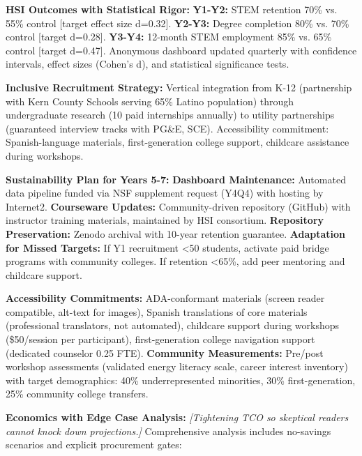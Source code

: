 \documentclass[12pt]{article}
\begin{document}
\textbf{HSI Outcomes with Statistical Rigor:} \textbf{Y1-Y2:} STEM retention 70\% vs. 55\% control [target effect size d=0.32]. \textbf{Y2-Y3:} Degree completion 80\% vs. 70\% control [target d=0.28]. \textbf{Y3-Y4:} 12-month STEM employment 85\% vs. 65\% control [target d=0.47]. Anonymous dashboard updated quarterly with confidence intervals, effect sizes (Cohen's d), and statistical significance tests.

\textbf{Inclusive Recruitment Strategy:} Vertical integration from K-12 (partnership with Kern County Schools serving 65\% Latino population) through undergraduate research (10 paid internships annually) to utility partnerships (guaranteed interview tracks with PG\&E, SCE). Accessibility commitment: Spanish-language materials, first-generation college support, childcare assistance during workshops.

\textbf{Sustainability Plan for Years 5-7:} \textbf{Dashboard Maintenance:} Automated data pipeline funded via NSF supplement request (Y4Q4) with hosting by Internet2. \textbf{Courseware Updates:} Community-driven repository (GitHub) with instructor training materials, maintained by HSI consortium. \textbf{Repository Preservation:} Zenodo archival with 10-year retention guarantee. \textbf{Adaptation for Missed Targets:} If Y1 recruitment <50 students, activate paid bridge programs with community colleges. If retention <65\%, add peer mentoring and childcare support.

\textbf{Accessibility Commitments:} ADA-conformant materials (screen reader compatible, alt-text for images), Spanish translations of core materials (professional translators, not automated), childcare support during workshops (\$50/session per participant), first-generation college navigation support (dedicated counselor 0.25 FTE). \textbf{Community Measurements:} Pre/post workshop assessments (validated energy literacy scale, career interest inventory) with target demographics: 40\% underrepresented minorities, 30\% first-generation, 25\% community college transfers.

\textbf{Economics with Edge Case Analysis:} \textit{[Tightening TCO so skeptical readers cannot knock down projections.]} Comprehensive analysis includes no-savings scenarios and explicit procurement gates:
\end{document}
